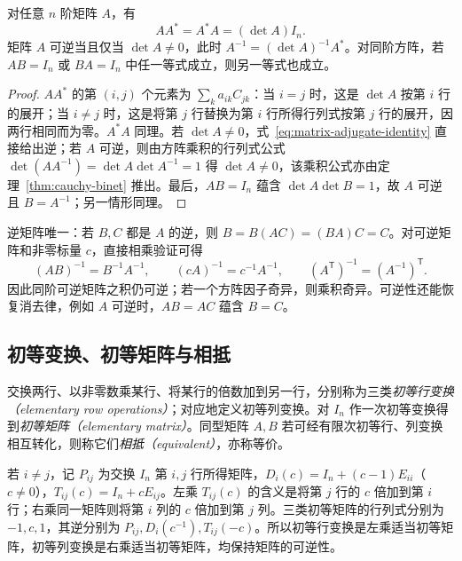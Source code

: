 \begin{theorem}
\label{thm:matrix-invertibility}
对任意 $n$ 阶矩阵 $A$，有
\begin{equation}
 AA^*=A^*A=(\det A)I_n.
 \label{eq:matrix-adjugate-identity}
\end{equation}
矩阵 $A$ 可逆当且仅当 $\det A\ne0$，此时 $A^{-1}=(\det A)^{-1}A^*$。对同阶方阵，若 $AB=I_n$ 或 $BA=I_n$ 中任一等式成立，则另一等式也成立。
\end{theorem}
\begin{proof}
$AA^*$ 的第 $(i,j)$ 个元素为 $\sum_k a_{ik}C_{jk}$：当 $i=j$ 时，这是 $\det A$ 按第 $i$ 行的展开；当 $i\ne j$ 时，这是将第 $j$ 行替换为第 $i$ 行所得行列式按第 $j$ 行的展开，因两行相同而为零。$A^*A$ 同理。若 $\det A\ne0$，式~\eqref{eq:matrix-adjugate-identity} 直接给出逆；若 $A$ 可逆，则由方阵乘积的行列式公式 $\det(AA^{-1})=\det A\det A^{-1}=1$ 得 $\det A\ne0$，该乘积公式亦由定理~\ref{thm:cauchy-binet} 推出。最后，$AB=I_n$ 蕴含 $\det A\det B=1$，故 $A$ 可逆且 $B=A^{-1}$；另一情形同理。
\end{proof}

逆矩阵唯一：若 $B,C$ 都是 $A$ 的逆，则 $B=B(AC)=(BA)C=C$。对可逆矩阵和非零标量 $c$，直接相乘验证可得
\begin{equation}
 (AB)^{-1}=B^{-1}A^{-1},\qquad
 (cA)^{-1}=c^{-1}A^{-1},\qquad
 (A^{\mathsf T})^{-1}=(A^{-1})^{\mathsf T}.
 \label{eq:matrix-inverse-rules}
\end{equation}
因此同阶可逆矩阵之积仍可逆；若一个方阵因子奇异，则乘积奇异。可逆性还能恢复消去律，例如 $A$ 可逆时，$AB=AC$ 蕴含 $B=C$。

\subsection{初等变换、初等矩阵与相抵}
\label{subsec:matrix-elementary-basic}

\begin{definition}
交换两行、以非零数乘某行、将某行的倍数加到另一行，分别称为三类\emph{初等行变换（elementary row operations）}；对应地定义初等列变换。对 $I_n$ 作一次初等变换得到\emph{初等矩阵（elementary matrix）}。同型矩阵 $A,B$ 若可经有限次初等行、列变换相互转化，则称它们\emph{相抵（equivalent）}，亦称等价。
\end{definition}

若 $i\ne j$，记 $P_{ij}$ 为交换 $I_n$ 第 $i,j$ 行所得矩阵，$D_i(c)=I_n+(c-1)E_{ii}$（$c\ne0$），$T_{ij}(c)=I_n+cE_{ij}$。左乘 $T_{ij}(c)$ 的含义是将第 $j$ 行的 $c$ 倍加到第 $i$ 行；右乘同一矩阵则将第 $i$ 列的 $c$ 倍加到第 $j$ 列。三类初等矩阵的行列式分别为 $-1,c,1$，其逆分别为 $P_{ij},D_i(c^{-1}),T_{ij}(-c)$。所以初等行变换是左乘适当初等矩阵，初等列变换是右乘适当初等矩阵，均保持矩阵的可逆性。

